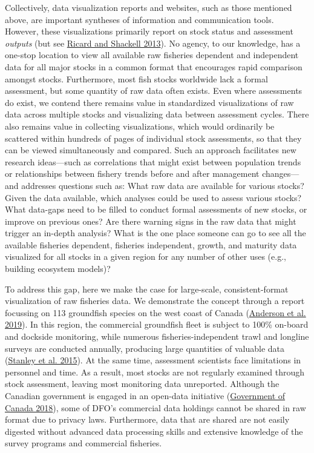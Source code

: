 \documentclass[12pt,]{article}
\begin{document}
Collectively, data visualization reports and websites, such as those mentioned above, are important syntheses of information and communication tools.
However, these visualizations primarily report on stock status and assessment \emph{outputs} (but see \protect\hyperlink{ref-ricard2013}{Ricard and Shackell 2013}). No agency, to our knowledge, has a one-stop location to view all available raw fisheries dependent and independent data for all major stocks in a common format that encourages rapid comparison amongst stocks.
Furthermore, most fish stocks worldwide lack a formal assessment, but some quantity of raw data often exists.
Even where assessments do exist, we contend there remains value in standardized visualizations of raw data across multiple stocks and visualizing data between assessment cycles.
There also remains value in collecting visualizations, which would ordinarily be scattered within hundreds of pages of individual stock assessments, so that they can be viewed simultaneously and compared.
Such an approach facilitates new research ideas---such as correlations that might exist between population trends or relationships between fishery trends before and after management changes---and addresses questions such as:
What raw data are available for various stocks? Given the data available, which analyses could be used to assess various stocks?
What data-gaps need to be filled to conduct formal assessments of new stocks, or improve on previous ones?
Are there warning signs in the raw data that might trigger an in-depth analysis?
What is the one place someone can go to see all the available fisheries dependent, fisheries independent, growth, and maturity data visualized for all stocks in a given region for any number of other uses (e.g., building ecosystem models)?

To address this gap, here we make the case for large-scale, consistent-format visualization of raw fisheries data. We demonstrate the concept through a report focussing on 113 groundfish species on the west coast of Canada (\protect\hyperlink{ref-anderson2019synopsis}{Anderson et al. 2019}).
In this region, the commercial groundfish fleet is subject to 100\% on-board and dockside monitoring, while numerous fisheries-independent trawl and longline surveys are conducted annually, producing large quantities of valuable data (\protect\hyperlink{ref-stanley2015}{Stanley et al. 2015}).
At the same time, assessment scientists face limitations in personnel and time.
As a result, most stocks are not regularly examined through stock assessment, leaving most monitoring data unreported.
Although the Canadian government is engaged in an open-data initiative (\protect\hyperlink{ref-canada2018}{Government of Canada 2018}), some of DFO's commercial data holdings cannot be shared in raw format due to privacy laws.
Furthermore, data that are shared are not easily digested without advanced data processing skills and extensive knowledge of the survey programs and commercial fisheries.
\end{document}

